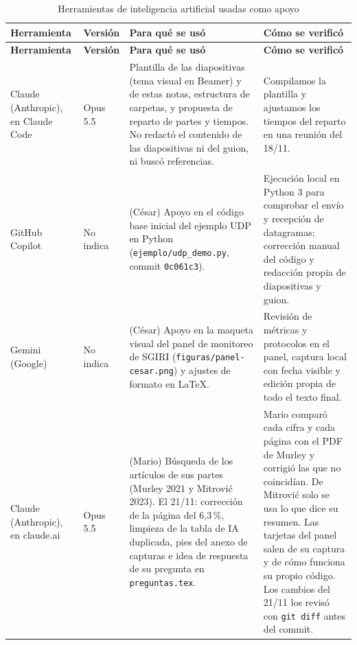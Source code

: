 \documentclass[11pt,a4paper]{article}
\begin{document}
{\small\renewcommand{\arraystretch}{1.2}
\begin{xltabular}{\textwidth}{@{}>{\raggedright\arraybackslash}p{2.8cm}>{\raggedright\arraybackslash}p{1.5cm}X>{\raggedright\arraybackslash}p{5.0cm}@{}}
  \caption{Herramientas de inteligencia artificial usadas como apoyo}\label{tab:declaracion-ia}\\
  \toprule
  \textbf{Herramienta} & \textbf{Versión} & \textbf{Para qué se usó} & \textbf{Cómo se verificó}\\
  \midrule
  \endfirsthead
  \toprule
  \textbf{Herramienta} & \textbf{Versión} & \textbf{Para qué se usó} & \textbf{Cómo se verificó}\\
  \midrule
  \endhead
  \bottomrule
  \endlastfoot
  Claude (Anthropic), en Claude Code & Opus 5.5 &
  Plantilla de las diapositivas (tema visual en Beamer) y de estas notas, estructura de carpetas,
  y propuesta de reparto de partes y tiempos. No redactó el contenido de las diapositivas ni del
  guion, ni buscó referencias. &
  Compilamos la plantilla y ajustamos los tiempos del reparto en una reunión del 18/11.\\
  GitHub Copilot & No indica &
  (César) Apoyo en el código base inicial del ejemplo UDP en Python (\texttt{ejemplo/udp\_demo.py}, commit \texttt{0c061c3}). &
  Ejecución local en Python 3 para comprobar el envío y recepción de datagramas; corrección manual del código y redacción propia de diapositivas y guion.\\
  Gemini (Google) & No indica &
  (César) Apoyo en la maqueta visual del panel de monitoreo de SGIRI (\texttt{figuras/panel-cesar.png}) y ajustes de formato en LaTeX. &
  Revisión de métricas y protocolos en el panel, captura local con fecha visible y edición propia de todo el texto final.\\
  Claude (Anthropic), en claude.ai & Opus 5.5 &
  (Mario) Búsqueda de los artículos de sus partes (Murley 2021 y Mitrović 2023).
  El 21/11: corrección de la página del 6,3\,\%, limpieza de la tabla de IA
  duplicada, pies del anexo de capturas e idea de respuesta de su pregunta en \texttt{preguntas.tex}. &
  Mario comparó cada cifra y cada página con el PDF de Murley y corrigió las que no coincidían. De
  Mitrović solo se usa lo que dice su resumen. Las tarjetas del panel salen de su captura y de cómo
  funciona su propio código. Los cambios del 21/11 los revisó con \texttt{git diff} antes del commit.\\
\end{xltabular}}
\end{document}
